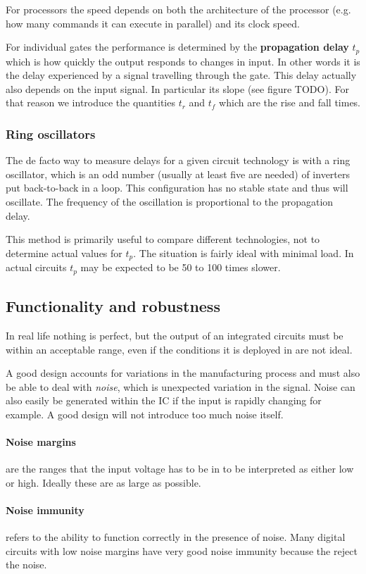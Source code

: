 \documentclass{report}
\begin{document}
For processors the speed depends on both the architecture of the processor (e.g. how many commands it can execute in parallel) and its clock speed.

For individual gates the performance is determined by the \textbf{propagation delay} $t_p$ which is how quickly the output responds to changes in input. In other words it is the delay experienced by a signal travelling through the gate. This delay actually also depends on the input signal. In particular its slope (see figure TODO). For that reason we introduce the quantities $t_r$ and $t_f$ which are the rise and fall times.

\subsubsection{Ring oscillators}
The de facto way to measure delays for a given circuit technology is with a ring oscillator, which is an odd number (usually at least five are needed) of inverters put back-to-back in a loop. This configuration has no stable state and thus will oscillate. The frequency of the oscillation is proportional to the propagation delay.

This method is primarily useful to compare different technologies, not to determine actual values for $t_p$. The situation is fairly ideal with minimal load. In actual circuits $t_p$ may be expected to be 50 to 100 times slower. 

\subsection{Functionality and robustness}
In real life nothing is perfect, but the output of an integrated circuits must be within an acceptable range, even if the conditions it is deployed in are not ideal.

A good design accounts for variations in the manufacturing process and must also be able to deal with \textit{noise}, which is unexpected variation in the signal. Noise can also easily be generated within the IC if the input is rapidly changing for example. A good design will not introduce too much noise itself.
\paragraph{Noise margins} are the ranges that the input voltage has to be in to be interpreted as either low or high. Ideally these are as large as possible.
\paragraph{Noise immunity} refers to the ability to function correctly in the presence of noise. Many digital circuits with low noise margins have very good noise immunity because the reject the noise.
\end{document}

